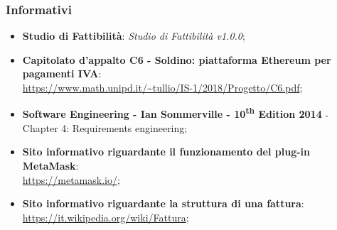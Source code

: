 \subsubsection{Informativi}
\begin{itemize}
	\item \textbf{Studio di Fattibilità}: \textit{Studio di Fattibilità v1.0.0};
	\item \textbf{Capitolato d'appalto C6 - Soldino: piattaforma Ethereum per pagamenti IVA}: \\ \url{ https://www.math.unipd.it/~tullio/IS-1/2018/Progetto/C6.pdf};
	\item \textbf{Software Engineering - Ian Sommerville - 10\textsuperscript{th} Edition 2014}
	\subitem - Chapter 4: Requirements engineering;
	\item \textbf{Sito informativo riguardante il funzionamento del plug-in MetaMask}:\\ \textsf{\url{ https://metamask.io/}};
	\item \textbf{Sito informativo riguardante la struttura di una fattura}:\\ \textsf{\url{ https://it.wikipedia.org/wiki/Fattura}};

\end{itemize}